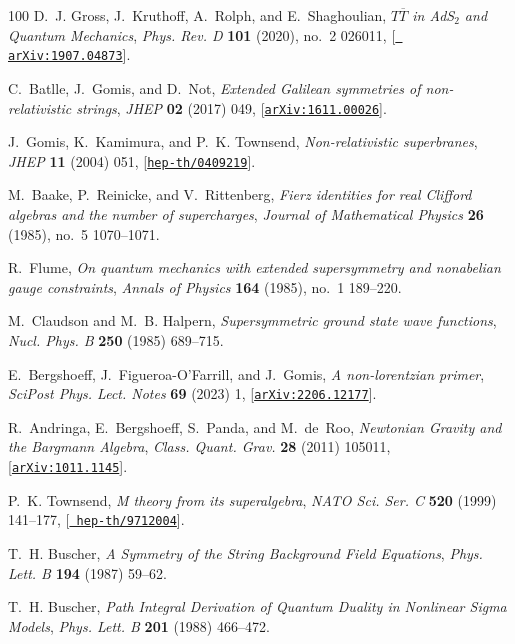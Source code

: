 \documentclass[11pt]{article}
\begin{document}
\begin{thebibliography}{100}
D.~J. Gross, J.~Kruthoff, A.~Rolph, and E.~Shaghoulian, {\it {$T\overline{T}$
  in AdS$_2$ and Quantum Mechanics}},  {\em Phys. Rev. D} {\bf 101} (2020),
  no.~2 026011, [\href{http://arxiv.org/abs/1907.04873}{{\tt
  arXiv:1907.04873}}].

C.~Batlle, J.~Gomis, and D.~Not, {\it {Extended Galilean symmetries of
  non-relativistic strings}},  {\em JHEP} {\bf 02} (2017) 049,
  [\href{http://arxiv.org/abs/1611.00026}{{\tt arXiv:1611.00026}}].

J.~Gomis, K.~Kamimura, and P.~K. Townsend, {\it {Non-relativistic
  superbranes}},  {\em JHEP} {\bf 11} (2004) 051,
  [\href{http://arxiv.org/abs/hep-th/0409219}{{\tt hep-th/0409219}}].

M.~Baake, P.~Reinicke, and V.~Rittenberg, {\it {Fierz identities for real
  Clifford algebras and the number of supercharges}},  {\em Journal of
  Mathematical Physics} {\bf 26} (1985), no.~5 1070--1071.

R.~Flume, {\it On quantum mechanics with extended supersymmetry and nonabelian
  gauge constraints},  {\em Annals of Physics} {\bf 164} (1985), no.~1
  189--220.

M.~Claudson and M.~B. Halpern, {\it {Supersymmetric ground state wave
  functions}},  {\em Nucl. Phys. B} {\bf 250} (1985) 689--715.

E.~Bergshoeff, J.~Figueroa-O'Farrill, and J.~Gomis, {\it {A non-lorentzian
  primer}},  {\em SciPost Phys. Lect. Notes} {\bf 69} (2023) 1,
  [\href{http://arxiv.org/abs/2206.12177}{{\tt arXiv:2206.12177}}].

R.~Andringa, E.~Bergshoeff, S.~Panda, and M.~de~Roo, {\it {Newtonian Gravity
  and the Bargmann Algebra}},  {\em Class. Quant. Grav.} {\bf 28} (2011)
  105011, [\href{http://arxiv.org/abs/1011.1145}{{\tt arXiv:1011.1145}}].

P.~K. Townsend, {\it {M theory from its superalgebra}},  {\em NATO Sci. Ser. C}
  {\bf 520} (1999) 141--177, [\href{http://arxiv.org/abs/hep-th/9712004}{{\tt
  hep-th/9712004}}].

T.~H. Buscher, {\it {A Symmetry of the String Background Field Equations}},
  {\em Phys. Lett. B} {\bf 194} (1987) 59--62.

T.~H. Buscher, {\it {Path Integral Derivation of Quantum Duality in Nonlinear
  Sigma Models}},  {\em Phys. Lett. B} {\bf 201} (1988) 466--472.


\end{thebibliography}
\end{document}
